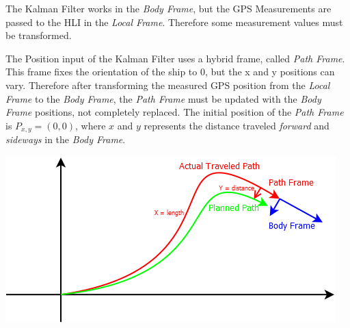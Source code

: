 The Kalman Filter works in the \emph{Body Frame}, but the GPS Measurements are passed to the HLI in the \emph{Local Frame}. Therefore some measurement values must be transformed.

The Position input of the Kalman Filter uses a hybrid frame, called \emph{Path Frame}. This frame fixes the orientation of the ship to 0, but the x and y positions can vary. Therefore after transforming the measured GPS position from the \emph{Local Frame} to the \emph{Body Frame}, the \emph{Path Frame} must be updated with the \emph{Body Frame} positions, not completely replaced. The initial position of the \emph{Path Frame} is $P_{x,y} = (0, 0)$, where $x$ and $y$ represents the distance traveled \emph{forward} and \emph{sideways} in the \emph{Body Frame}.

\includegraphics[width = \textwidth]{img/ControlStrategyFigures/PathFrame.png}


